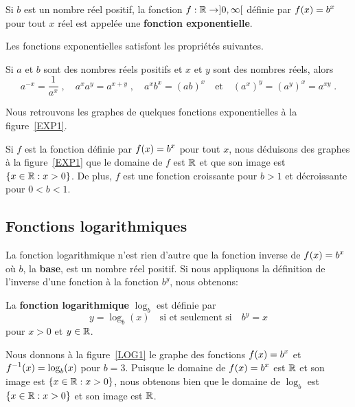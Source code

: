 {\begin{defn} 
Si $b$ est un nombre réel positif, la fonction
$f:\mathbb{R}\rightarrow ]0,\infty[$ définie par $\displaystyle f(x) = b^x$ pour tout $x$
réel est appelée une {\bfseries fonction exponentielle}.
\end{defn}

Les fonctions exponentielles satisfont les propriétés suivantes.

\begin{prop}
Si $a$ et $b$ sont des nombres réels positifs et $x$ et $y$ sont des
nombres réels, alors
\[
a^{-x} = \frac{1}{a^x} \; , \quad a^x a^y = a^{x+y} \; ,
\quad a^x b^x = (ab)^x \quad \text{et} \quad
\left(a^x\right)^y = \left(a^y\right)^x = a^{xy} \; .
\]
\end{prop}

Nous retrouvons les graphes de quelques fonctions exponentielles à la
figure~\ref{EXP1}.

Si $f$ est la fonction définie par $\displaystyle f(x) = b^x$ pour tout $x$, nous
déduisons des graphes à la figure~\ref{EXP1} que le domaine de $f$ est
$\mathbb{R}$ et que son image est $\{ x \in \mathbb{R} : x > 0 \}$.  De plus, $f$
est une fonction croissante pour $b>1$ et décroissante pour $0<b<1$.

\subsection{Fonctions logarithmiques}

La fonction logarithmique n'est rien d'autre que la fonction inverse
de $\displaystyle f(x) = b^x$ où $b$, la {\bfseries base}, est un nombre réel
positif.  Si nous appliquons la définition de l'inverse d'une fonction à
la fonction $b^y$, nous obtenons:

\begin{defn} 
La {\bfseries fonction logarithmique} $\log_b$ est définie par
\[
y = \log_b(x)  \quad \text{si et seulement si} \quad  b^y = x
\]
pour $x>0$ et $y\in\mathbb{R}$.
\end{defn}

Nous donnons à la figure~\ref{LOG1} le graphe des fonctions $\displaystyle f(x) = b^x$
et $\displaystyle f^{-1}(x) = \log_b(x)$ pour $b=3$.  Puisque le domaine de
$\displaystyle f(x) = b^x$ est $\mathbb{R}$ et son image est $\{ x \in \mathbb{R} : x > 0 \}$, nous
obtenons bien que le domaine de $\log_b$ est $\{ x \in \mathbb{R} : x > 0 \}$
et son image est $\mathbb{R}$.

}
